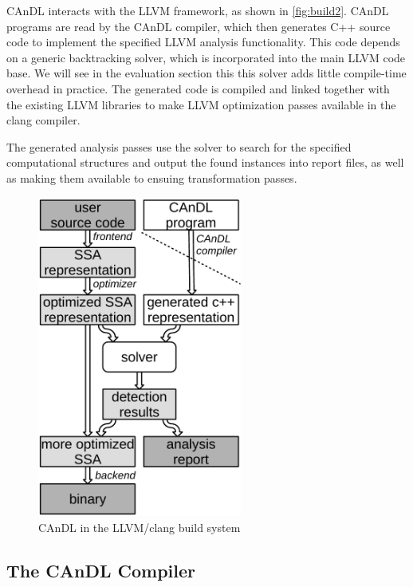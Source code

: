     CAnDL interacts with the LLVM framework, as shown in \autoref{fig:build2}.
    CAnDL programs are read by the CAnDL compiler, which then generates C++
    source code to implement the specified LLVM analysis functionality.
    This code depends on a generic backtracking solver, which is incorporated
    into the main LLVM code base. 
    We will see in the evaluation section this this solver adds little
    compile-time overhead in practice.
    The generated code is compiled and linked together with the existing LLVM
    libraries to make LLVM optimization passes available in the clang compiler.

    The generated analysis passes use the solver to search for the specified
    computational structures and output the found instances into report files,
    as well as making them available to ensuing transformation passes.

\begin{figure}[ht]
\centering
\includegraphics[width=0.6\textwidth]{figures/compilerFlow2.pdf}
\caption{CAnDL in the LLVM/clang build system}
\label{fig:build2}
\end{figure}

\subsection{The CAnDL Compiler}

